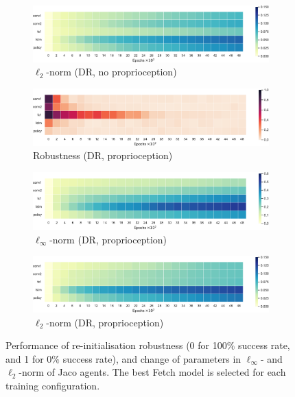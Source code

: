 \begin{figure}[h!]
  \begin{subfigure}{0.32\textwidth}
    \includegraphics[width=\textwidth]{figures/chapter6/robustness/jaco/visual_random/l2_dist}
    \caption{$\ell_2$-norm (DR, no proprioception)}
  \end{subfigure}
  \begin{subfigure}{0.32\textwidth}
    \includegraphics[width=\textwidth]{figures/chapter6/robustness/jaco/sensor_random/error}
    \caption{Robustness (DR, proprioception)}
  \end{subfigure}
  \begin{subfigure}{0.32\textwidth}
    \includegraphics[width=\textwidth]{figures/chapter6/robustness/jaco/sensor_random/inf_dist}
    \caption{$\ell_\infty$-norm (DR, proprioception)}
  \end{subfigure}
  \begin{subfigure}{0.32\textwidth}
    \includegraphics[width=\textwidth]{figures/chapter6/robustness/jaco/sensor_random/l2_dist}
    \caption{$\ell_2$-norm (DR, proprioception)}
  \end{subfigure}
  \caption{Performance of re-initialisation robustness (0 for 100$\%$ success rate, and 1 for 0$\%$ success rate), and change of parameters in $\ell_\infty$- and $\ell_2$-norm of Jaco agents. The best Fetch model is selected for each training configuration.}
  \label{fig:jaco_robustness}
\end{figure}

